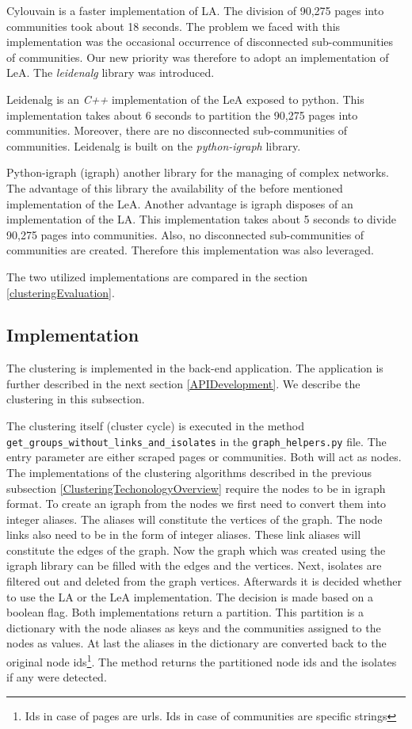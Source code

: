 Cylouvain is a faster implementation of LA. The division of 90,275 pages into communities took about 18 seconds. The problem we faced with this implementation was the occasional occurrence of disconnected sub-communities of communities. Our new priority was therefore to adopt an implementation of LeA. The \textit{leidenalg} \cite{leidenalg} library was introduced.

Leidenalg is an \textit{C++} implementation of the LeA exposed to python. This implementation takes about 6 seconds to partition the 90,275 pages into communities. Moreover, there are no disconnected sub-communities of communities. Leidenalg is built on the \textit{python-igraph} library. 

Python-igraph (igraph) another library for the managing of complex networks. The advantage of this library the availability of the before mentioned implementation of the LeA. Another advantage is igraph disposes of an implementation of the LA. This implementation takes about 5 seconds to divide 90,275 pages into communities. Also, no disconnected sub-communities of communities are created. Therefore this implementation was also leveraged.

The two utilized implementations are compared in the section \ref{clusteringEvaluation}.

\subsection{Implementation} \label{ClusteringImplementation}
The clustering is implemented in the back-end application. The application is further described in the next section \ref{APIDevelopment}. We describe the clustering in this subsection. 

The clustering itself (cluster cycle) is executed in the method \\ \texttt{get\_groups\_without\_links\_and\_isolates} in the \texttt{graph\_helpers.py} file. The entry parameter are either scraped pages or communities. Both will act as nodes. The implementations of the clustering algorithms described in the previous subsection \ref{ClusteringTechonologyOverview} require the nodes to be in igraph format. To create an igraph from the nodes we first need to convert them into integer aliases. The aliases will constitute the vertices of the graph. The node links also need to be in the form of integer aliases. These link aliases will constitute the edges of the graph. Now the graph which was created using the igraph library can be filled with the edges and the vertices. Next, isolates are filtered out and deleted from the graph vertices. Afterwards it is decided whether to use the LA or the LeA implementation. The decision is made based on a boolean flag. Both implementations return a partition. This partition is a dictionary with the node aliases as keys and the communities assigned to the nodes as values. At last the aliases in the dictionary are converted back to the original node ids\footnote{Ids in case of pages are urls. Ids in case of communities are specific strings}. The method returns the partitioned node ids and the isolates if any were detected. 

